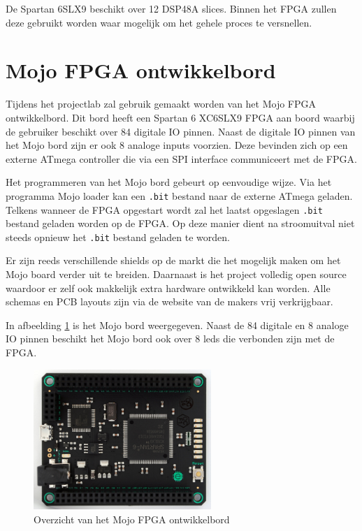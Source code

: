 		\par De Spartan 6SLX9 beschikt over 12 DSP48A slices. Binnen het FPGA zullen deze gebruikt worden waar mogelijk om het gehele proces te versnellen.
\newpage
	\section{Mojo FPGA ontwikkelbord}

		\par Tijdens het projectlab zal gebruik gemaakt worden van het Mojo FPGA ontwikkelbord. Dit bord heeft een Spartan 6 XC6SLX9 FPGA aan boord waarbij de gebruiker beschikt over 84 digitale IO pinnen. Naast de digitale IO pinnen van het Mojo bord zijn er ook 8 analoge inputs voorzien. Deze bevinden zich op een externe ATmega controller die via een SPI interface communiceert met de FPGA.

		\par Het programmeren van het Mojo bord gebeurt op eenvoudige wijze. Via het programma Mojo loader kan een \texttt{.bit} bestand naar de externe ATmega geladen. Telkens wanneer de FPGA opgestart wordt zal het laatst opgeslagen \texttt{.bit} bestand geladen worden op de FPGA. Op deze manier dient na stroomuitval niet steeds opnieuw het \texttt{.bit} bestand geladen te worden.

		\par Er zijn reeds verschillende shields op de markt die het mogelijk maken om het Mojo board verder uit te breiden. Daarnaast is het project volledig open source waardoor er zelf ook makkelijk extra hardware ontwikkeld kan worden. Alle schema\textquotesingle s en PCB layouts zijn via de website van de makers vrij verkrijgbaar.

		\par In afbeelding \ref{mojo} is het Mojo bord weergegeven. Naast de 84 digitale en 8 analoge IO pinnen beschikt het Mojo bord ook over 8 leds die verbonden zijn met de FPGA.

			\begin{figure}[H]					  
				  \centering
				  \includegraphics[width=0.6\textwidth]{Vooronderzoek/mojo.png}
				  \caption{Overzicht van het Mojo FPGA ontwikkelbord}
				  \label{mojo}
			\end{figure}
\newpage
